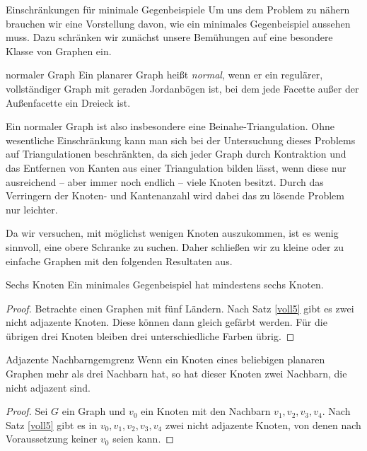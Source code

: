 \begin{section}{Einschränkungen für minimale Gegenbeispiele}
 Um uns dem Problem zu nähern brauchen wir eine Vorstellung davon, wie ein minimales Gegenbeispiel aussehen muss. Dazu schränken wir zunächst unsere Bemühungen auf eine  besondere Klasse von Graphen ein.
 
 \begin{definition}{normaler Graph}
  Ein planarer Graph heißt \textit{normal}, wenn er ein regulärer, vollständiger Graph mit geraden Jordanbögen ist, bei dem jede Facette außer der Außenfacette ein Dreieck ist.
 \end{definition}
 
 Ein normaler Graph ist also insbesondere eine Beinahe-Triangulation. Ohne wesentliche Einschränkung kann man sich bei der Untersuchung dieses Problems auf Triangulationen beschränkten, da sich jeder Graph durch Kontraktion und das Entfernen von Kanten aus einer Triangulation bilden lässt, wenn diese nur ausreichend -- aber immer noch endlich -- viele Knoten besitzt. Durch das Verringern der Knoten- und Kantenanzahl wird dabei das zu lösende Problem nur leichter. 
 
 Da wir versuchen, mit möglichst wenigen Knoten auszukommen, ist es wenig sinnvoll, eine obere Schranke zu suchen. Daher schließen wir zu kleine oder zu einfache Graphen mit den folgenden Resultaten aus.
 
 \begin{proposition}{Sechs Knoten}
  Ein minimales Gegenbeispiel hat mindestens sechs Knoten.
 \end{proposition}
 \begin{proof}
  Betrachte einen Graphen mit fünf Ländern. Nach Satz \ref{voll5} gibt es zwei nicht adjazente Knoten. Diese können dann gleich gefärbt werden. Für die übrigen drei Knoten bleiben drei unterschiedliche Farben übrig.
 \end{proof}
 
 \begin{propositionl}{Adjazente Nachbarn}{gemgrenz}
  Wenn ein Knoten eines beliebigen planaren Graphen mehr als drei Nachbarn hat, so hat dieser Knoten zwei Nachbarn, die nicht adjazent sind.
 \end{propositionl}
 \begin{proof}
  Sei $G$ ein Graph und $v_0$ ein Knoten mit den Nachbarn $v_1,v_2,v_3,v_4$. Nach Satz \ref{voll5} gibt es in $v_0,v_1,v_2,v_3,v_4$ zwei nicht adjazente Knoten, von denen nach Voraussetzung keiner $v_0$ seien kann.
 \end{proof}
 

\end{section}
